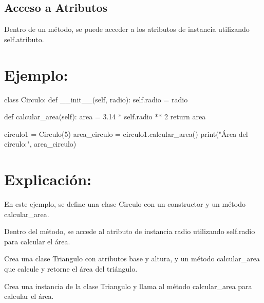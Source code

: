 \documentclass[
  a4paper,
  DIV=11,
  numbers=noendperiod,
  onepage,
  openany]{scrreprt}
\newenvironment{Shaded}{\begin{snugshade}}{\end{snugshade}}
\newcommand{\BuiltInTok}[1]{\textcolor[rgb]{0.00,0.23,0.31}{#1}}
\newcommand{\ControlFlowTok}[1]{\textcolor[rgb]{0.00,0.23,0.31}{#1}}
\newcommand{\DecValTok}[1]{\textcolor[rgb]{0.68,0.00,0.00}{#1}}
\newcommand{\FloatTok}[1]{\textcolor[rgb]{0.68,0.00,0.00}{#1}}
\newcommand{\FunctionTok}[1]{\textcolor[rgb]{0.28,0.35,0.67}{#1}}
\newcommand{\KeywordTok}[1]{\textcolor[rgb]{0.00,0.23,0.31}{#1}}
\newcommand{\NormalTok}[1]{\textcolor[rgb]{0.00,0.23,0.31}{#1}}
\newcommand{\OperatorTok}[1]{\textcolor[rgb]{0.37,0.37,0.37}{#1}}
\newcommand{\StringTok}[1]{\textcolor[rgb]{0.13,0.47,0.30}{#1}}
\newcommand{\VariableTok}[1]{\textcolor[rgb]{0.07,0.07,0.07}{#1}}
\begin{document}
\hypertarget{acceso-a-atributos-1}{%
\subsection{Acceso a Atributos}\label{acceso-a-atributos-1}}

Dentro de un método, se puede acceder a los atributos de instancia
utilizando self.atributo.

\hypertarget{ejemplo-53}{%
\section{Ejemplo:}\label{ejemplo-53}}

\begin{Shaded}
\begin{Highlighting}[]
\KeywordTok{class}\NormalTok{ Circulo:}
    \KeywordTok{def} \FunctionTok{\_\_init\_\_}\NormalTok{(}\VariableTok{self}\NormalTok{, radio):}
        \VariableTok{self}\NormalTok{.radio }\OperatorTok{=}\NormalTok{ radio}

    \KeywordTok{def}\NormalTok{ calcular\_area(}\VariableTok{self}\NormalTok{):}
\NormalTok{        area }\OperatorTok{=} \FloatTok{3.14} \OperatorTok{*} \VariableTok{self}\NormalTok{.radio }\OperatorTok{**} \DecValTok{2}
        \ControlFlowTok{return}\NormalTok{ area}

\NormalTok{circulo1 }\OperatorTok{=}\NormalTok{ Circulo(}\DecValTok{5}\NormalTok{)}
\NormalTok{area\_circulo }\OperatorTok{=}\NormalTok{ circulo1.calcular\_area()}
\BuiltInTok{print}\NormalTok{(}\StringTok{"Área del círculo:"}\NormalTok{, area\_circulo)}
\end{Highlighting}
\end{Shaded}

\hypertarget{explicaciuxf3n-53}{%
\section{Explicación:}\label{explicaciuxf3n-53}}

En este ejemplo, se define una clase Circulo con un constructor y un
método calcular\_area.

Dentro del método, se accede al atributo de instancia radio utilizando
self.radio para calcular el área.

\begin{tcolorbox}[enhanced jigsaw, colbacktitle=quarto-callout-important-color!10!white, toprule=.15mm, leftrule=.75mm, titlerule=0mm, opacityback=0, rightrule=.15mm, opacitybacktitle=0.6, breakable, left=2mm, coltitle=black, title=\textcolor{quarto-callout-important-color}{\faExclamation}\hspace{0.5em}{Actividad Práctica:}, toptitle=1mm, bottomtitle=1mm, arc=.35mm, bottomrule=.15mm, colback=white, colframe=quarto-callout-important-color-frame]

Crea una clase Triangulo con atributos base y altura, y un método
calcular\_area que calcule y retorne el área del triángulo.

Crea una instancia de la clase Triangulo y llama al método
calcular\_area para calcular el área.

\end{tcolorbox}
\end{document}
